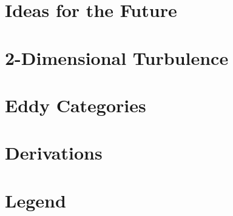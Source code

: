 
\appendix
\begin{appendices}
\begin{small}

\chapter{Ideas for the Future}

\chapter{2-Dimensional Turbulence}

\chapter{Eddy Categories}

\chapter{Derivations}


\chapter{Legend}



\end{small}
\end{appendices}
\FloatBarrier



